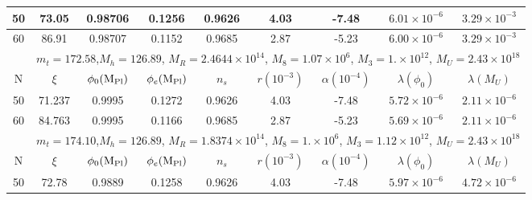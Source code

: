 \documentclass[aps,prd,preprint,superscriptaddress,showpacs,ctexart]{revtex4-1}
\providecommand{\tabularnewline}{\\}
\begin{document}
\begin{table}[H]
\begin{tabular}{|c|c|c|c|c|c|c|c|c|}
		\hline
		{\footnotesize{}{}{}50}  & {\footnotesize{}{}{}73.05}  & {\footnotesize{}{}{}0.98706}  & {\footnotesize{}{}{}0.1256}  & {\footnotesize{}{}{}0.9626}  & {\footnotesize{}{}{}4.03}  & {\footnotesize{}{}{}-7.48}  & {\footnotesize{}{}{}$6.01\times10^{-6}$}  & {\footnotesize{}{}{}$3.29\times10^{-3}$}\tabularnewline
		\hline
		{\footnotesize{}{}{}60}  & {\footnotesize{}{}{}86.91}  & {\footnotesize{}{}{}0.98707}  & {\footnotesize{}{}{}0.1152}  & {\footnotesize{}{}{}0.9685}  & {\footnotesize{}{}{}2.87}  & {\footnotesize{}{}{}-5.23}  & {\footnotesize{}{}{}$6.00\times10^{-6}$}  & {\footnotesize{}{}{}$3.29\times10^{-3}$ }\tabularnewline
		\hline
		& \multicolumn{8}{c|}{{\footnotesize{}{}{}$m_{t}=172.58$,$M_{h}=126.89$, $M_{R}=2.4644\times10^{14}$,
				$M_{8}=1.07\times10^{6}$, $M_{3}=1.\times10^{12}$, $M_{U}=2.43\times10^{18}$}}\tabularnewline
		\hline
		{\footnotesize{}{}{}N}  & {\footnotesize{}{}{}$\xi$ }  & {\footnotesize{}{}{}$\phi_{0}({\rm M_{Pl})}$}  & {\footnotesize{}{}{}$\phi_{e}({\rm M_{Pl})}$}  & {\footnotesize{}{}{}$n_{s}$}  & {\footnotesize{}{}{}$r(10^{-3})$}  & {\footnotesize{}{}{}$\alpha(10^{-4})$}  & {\footnotesize{}{}{}$\lambda(\phi_{0})$}  & {\footnotesize{}{}{}$\lambda(M_{U})$}\tabularnewline
		\hline
		{\footnotesize{}{}{}50}  & {\footnotesize{}{}{}71.237}  & {\footnotesize{}{}{}0.9995}  & {\footnotesize{}{}{}0.1272}  & {\footnotesize{}{}{}0.9626}  & {\footnotesize{}{}{}4.03}  & {\footnotesize{}{}{}-7.48 }  & {\footnotesize{}{}{}$5.72\times10^{-6}$}  & {\footnotesize{}{}{}$2.11\times10^{-6}$}\tabularnewline
		\hline
		{\footnotesize{}{}{}60}  & {\footnotesize{}{}{}84.763}  & {\footnotesize{}{}{}0.9995}  & {\footnotesize{}{}{}0.1166}  & {\footnotesize{}{}{}0.9685}  & {\footnotesize{}{}{}2.87}  & {\footnotesize{}{}{}-5.23}  & {\footnotesize{}{}{}$5.69\times10^{-6}$}  & {\footnotesize{}{}{}$2.11\times10^{-6}$ }\tabularnewline
		\hline
		\hline
		& \multicolumn{8}{c|}{{\footnotesize{}{}{}$m_{t}=174.10$,$M_{h}=126.89$, $M_{R}=1.8374\times10^{14}$,
				$M_{8}=1.\times10^{6}$, $M_{3}=1.12\times10^{12}$, $M_{U}=2.43\times10^{18}$}}\tabularnewline
		\hline
		{\footnotesize{}{}{}N}  & {\footnotesize{}{}{}$\xi$ }  & {\footnotesize{}{}{}$\phi_{0}({\rm M_{Pl})}$}  & {\footnotesize{}{}{}$\phi_{e}({\rm M_{Pl})}$}  & {\footnotesize{}{}{}$n_{s}$}  & {\footnotesize{}{}{}$r(10^{-3})$}  & {\footnotesize{}{}{}$\alpha(10^{-4})$}  & {\footnotesize{}{}{}$\lambda(\phi_{0})$}  & {\footnotesize{}{}{}$\lambda(M_{U})$}\tabularnewline
		\hline
		{\footnotesize{}{}{}50}  & {\footnotesize{}{}{}72.78 }  & {\footnotesize{}{}{}0.9889}  & {\footnotesize{}{}{}0.1258}  & {\footnotesize{}{}{}0.9626}  & {\footnotesize{}{}{}4.03}  & {\footnotesize{}{}{}-7.48}  & {\footnotesize{}{}{}$5.97\times10^{-6}$}  & {\footnotesize{}{}{}$4.72\times10^{-6}$}\tabularnewline

\end{tabular}
\end{table}
\end{document}
